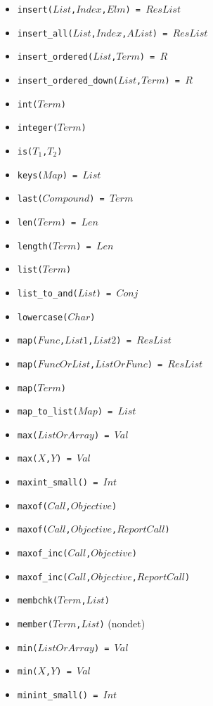 \documentclass[10pt]{article}
\begin{document}
\begin{multicols}{2}
\begin{scriptsize}
\begin{itemize}
    \item \texttt{insert($List$,$Index$,$Elm$) = $ResList$} 
    \item \texttt{insert\_all($List$,$Index$,$AList$) = $ResList$} 
    \item \texttt{insert\_ordered($List$,$Term$) = $R$} 
    \item \texttt{insert\_ordered\_down($List$,$Term$) = $R$} 
    \item \texttt{int($Term$)} 
    \item \texttt{integer($Term$)} 
    \item \texttt{is($T_1$,$T_2$)} 
    \item \texttt{keys($Map$) = $List$} 
    \item \texttt{last($Compound$) = $Term$} 
    \item \texttt{len($Term$) = $Len$} 
    \item \texttt{length($Term$) = $Len$} 
    \item \texttt{list($Term$)} 
    \item \texttt{list\_to\_and($List$) = $Conj$}
    \item \texttt{lowercase($Char$)} 
    \item \texttt{map($Func$,$List1$,$List2$) = $ResList$} 
    \item \texttt{map($FuncOrList$,$ListOrFunc$) = $ResList$} 
    \item \texttt{map($Term$)} 
    \item \texttt{map\_to\_list($Map$) = $List$} 
    \item \texttt{max($ListOrArray$) = $Val$} 
    \item \texttt{max($X$,$Y$) = $Val$} 
    \item \texttt{maxint\_small() = $Int$}
    \item \texttt{maxof($Call$,$Objective$)} 
    \item \texttt{maxof($Call$,$Objective$,$ReportCall$)} 
    \item \texttt{maxof\_inc($Call$,$Objective$)} 
    \item \texttt{maxof\_inc($Call$,$Objective$,$ReportCall$)} 
    \item \texttt{membchk($Term$,$List$)} 
    \item \texttt{member($Term$,$List$)} (nondet)
    \item \texttt{min($ListOrArray$) = $Val$} 
    \item \texttt{min($X$,$Y$) = $Val$} 
    \item \texttt{minint\_small() = $Int$}

\end{itemize}
\end{scriptsize}
\end{multicols}
\end{document}
